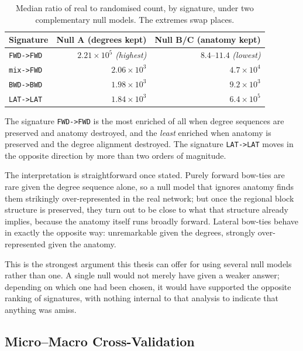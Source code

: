 \documentclass[12pt,a4paper,oneside]{article}
\theoremstyle{definition}
\theoremstyle{plain}
\newcommand{\code}[1]{\texttt{#1}}
\begin{document}
\begin{table}[H]
\centering
\caption{Median ratio of real to randomised count, by signature, under two
complementary null models. The extremes swap places.}
\label{tab:null-inversion}
\begin{tabular}{lrr}
\toprule
Signature & Null A (degrees kept) & Null B/C (anatomy kept) \\
\midrule
\code{FWD->FWD}  & $2.21 \times 10^{5}$ \emph{(highest)} & $8.4$--$11.4$ \emph{(lowest)} \\
\code{mix->FWD} & $2.06 \times 10^{3}$ & $4.7 \times 10^{4}$ \\
\code{BWD->BWD}  & $1.98 \times 10^{3}$ & $9.2 \times 10^{3}$ \\
\code{LAT->LAT}& $1.84 \times 10^{3}$ & $6.4 \times 10^{5}$ \\
\bottomrule
\end{tabular}
\end{table}

The signature \code{FWD->FWD} is the most enriched of all when degree
sequences are preserved and anatomy destroyed, and the \emph{least} enriched
when anatomy is preserved and the degree alignment destroyed. The signature
\code{LAT->LAT} moves in the opposite direction by more than two orders of
magnitude.

The interpretation is straightforward once stated. Purely forward bow-ties
are rare given the degree sequence alone, so a null model that ignores
anatomy finds them strikingly over-represented in the real network; but once
the regional block structure is preserved, they turn out to be close to what
that structure already implies, because the anatomy itself runs broadly
forward. Lateral bow-ties behave in exactly the opposite way:
unremarkable given the degrees, strongly over-represented given the anatomy.

This is the strongest argument this thesis can offer for using several null
models rather than one. A single null would not merely have given a weaker
answer; depending on which one had been chosen, it would have supported the
opposite ranking of signatures, with nothing internal to that analysis to
indicate that anything was amiss.

\subsection{Micro--Macro Cross-Validation}
\label{sec:results-bridge}
\end{document}

